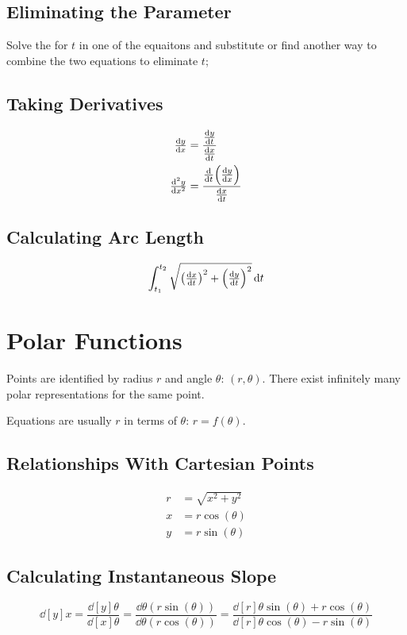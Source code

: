 \documentclass[12pt]{article}
\DeclarePairedDelimiter\paren{(}{)}
\newcommand*{\D}[1]{\mathop{}\!\mathrm{d}#1}
\newcommand*{\fixmath}{%
  \makebox{}\vspace{\glueexpr-\baselineskip-\abovedisplayskip}}
\newenvironment{fixaskip}{\setlength{\abovedisplayskip}{0pt}\fixmath%
  \ignorespaces}{\ignorespacesafterend}
\newenvironment{fixskip}{\setlength{\abovedisplayskip}{0pt}%
  \setlength{\belowdisplayskip}{0pt}\fixmath\ignorespaces}%
  {\ignorespacesafterend}
\begin{document}
\subsection*{Eliminating the Parameter}
Solve the for \(t\) in one of the equaitons and substitute or find another way
to combine the two equations to eliminate \(t\);
\subsection*{Taking Derivatives}
\begin{fixaskip}
  \begin{align*}
    \dd[y]{x} &= \frac{\dd[y]{t}}{\dd[x]{t}}\\
    \dd[2][y]{x} &= \frac{\dd{t}\paren*{\dd[y]{x}}}{\dd[x]{t}}
  \end{align*}
\end{fixaskip}
\subsection*{Calculating Arc Length}
\begin{fixskip}
  \[
    \int_{t_1}^{t_2}\sqrt{\paren*{\dd[x]{t}}^2 + \paren*{\dd[y]{t}}^2}\D{t}
  \]
\end{fixskip}
\section*{Polar Functions}
Points are identified by radius \(r\) and angle \(\theta\): \((r,\theta)\).
There exist infinitely many polar representations for the same point.

Equations are usually \(r\) in terms of \(\theta\): \(r = f(\theta)\).
\subsection*{Relationships With Cartesian Points}
\begin{fixskip}
  \begin{align*}
    r &= \sqrt{x^2+y^2}\\
    x &= r\cos(\theta)\\
    y &= r\sin(\theta)
  \end{align*}
\end{fixskip}
\subsection*{Calculating Instantaneous Slope}
\begin{fixskip}
  \[
    \dd[y]{x} = \frac{\dd[y]{\theta}}{\dd[x]{\theta}}
    = \frac{\dd{\theta}(r\sin(\theta))}{\dd{\theta}(r\cos(\theta))}
    = \frac{\dd[r]{\theta}\sin(\theta) + r\cos(\theta)}%
      {\dd[r]{\theta}\cos(\theta) - r\sin(\theta)}
  \]
\end{fixskip}
\end{document}
